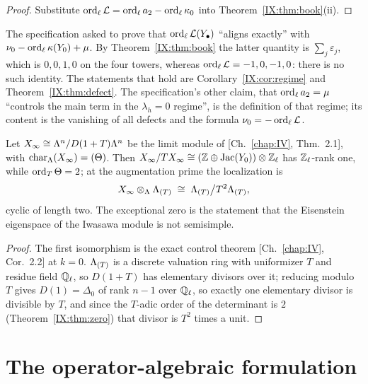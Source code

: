 \begin{proof}
Substitute $\operatorname{ord}_\ell\mathcal{L}=\operatorname{ord}_\ell a_2-\operatorname{ord}_\ell\kappa_0$ into
Theorem~\ref{IX:thm:book}(ii).
\end{proof}

\begin{remark}\label{IX:rem:align}
The specification asked to prove that $\operatorname{ord}_\ell\mathcal{L}(Y_\bullet)$ ``aligns exactly'' with
$\nu_0-\operatorname{ord}_\ell\kappa(Y_0)+\mu$. By Theorem~\ref{IX:thm:book} the latter quantity is
$\sum_j\varepsilon_j$, which is $0,0,1,0$ on the four towers, whereas
$\operatorname{ord}_\ell\mathcal{L}=-1,0,-1,0$: there is no such identity. The statements that hold are
Corollary~\ref{IX:cor:regime} and Theorem~\ref{IX:thm:defect}. The specification's other
claim, that $\operatorname{ord}_\ell a_2=\mu$ ``controls the main term in the $\lambda_h=0$ regime'',
is the definition of that regime; its content is the vanishing of all defects and the
formula $\nu_0=-\operatorname{ord}_\ell\mathcal{L}$.
\end{remark}

\begin{proposition}\label{IX:prop:module}
Let $X_\infty\cong\Lambda^{n}/D(1+T)\Lambda^{n}$ be the limit module of {\rm[Ch.~\ref{chap:IV}, Thm.~2.1]}, with
$\operatorname{char}_{\Lambda}(X_\infty)=(\Theta)$. Then $X_\infty/TX_\infty\cong(\mathbb{Z}\oplus\operatorname{Jac}(Y_0))\otimes\mathbb{Z}_\ell$
has $\mathbb{Z}_\ell$-rank one, while $\operatorname{ord}_T\Theta=2$; at the augmentation prime the localization
is
\[
X_\infty\otimes_{\Lambda}\Lambda_{(T)}\;\cong\;\Lambda_{(T)}\big/T^{2}\Lambda_{(T)} ,
\]
cyclic of length two. The exceptional zero is the statement that the Eisenstein
eigenspace of the Iwasawa module is not semisimple.
\end{proposition}

\begin{proof}
The first isomorphism is the exact control theorem [Ch.~\ref{chap:IV}, Cor.~2.2] at $k=0$.
$\Lambda_{(T)}$ is a discrete valuation ring with uniformizer $T$ and residue field $\mathbb{Q}_\ell$,
so $D(1+T)$ has elementary divisors over it; reducing modulo $T$ gives
$D(1)=\Delta_0$ of rank $n-1$ over $\mathbb{Q}_\ell$, so exactly one elementary divisor is divisible
by $T$, and since the $T$-adic order of the determinant is $2$
(Theorem~\ref{IX:thm:zero}) that divisor is $T^{2}$ times a unit.
\end{proof}

\section{The operator-algebraic formulation}\label{IX:sec:oa}

